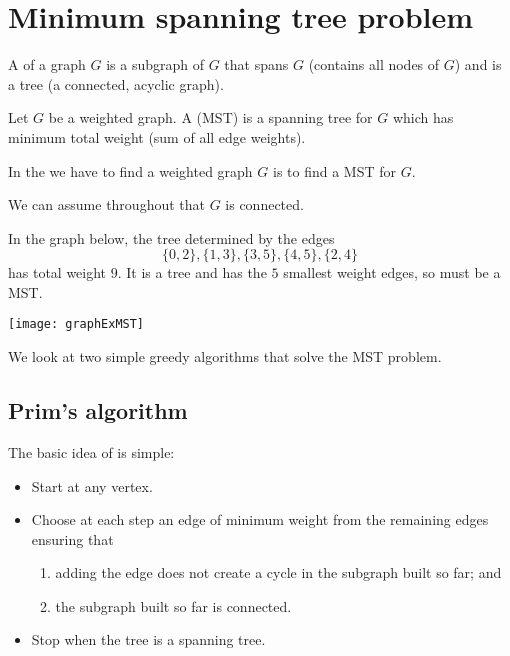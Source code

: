 \chapter{Minimum spanning tree problem} %
\label{sec:MST}
\begin{Definition}
A  of a graph $G$ is a subgraph of $G$ that spans $G$ (contains all nodes of $G$) and is a tree (a connected, acyclic graph).

Let $G$ be a weighted graph. 
A  (MST) is a spanning tree for $G$ which has minimum total weight 
(sum of all edge weights). 

In the  we have to find a weighted graph $G$ is to find a MST for $G$. 
\end{Definition}
We can assume throughout that $G$ is connected.


\begin{Boxample}
In the graph below, the tree determined by the edges
$$\{0, 2\}, \{1, 3\}, \{3, 5\}, \{4, 5\}, \{2, 4\}$$ 
has total weight $9$. 
It is a tree and has the $5$ smallest weight edges, so must be a MST.
\begin{center}
  \texttt{[image: graphExMST]}
\end{center}
\end{Boxample}

We look at two simple greedy algorithms that solve the MST problem.

\section{Prim's algorithm}
The basic idea of  is simple:
\begin{itemize}
\item Start at any vertex.
\item Choose at each step an edge of minimum weight from the remaining edges ensuring that
\begin{enumerate}
\item adding the edge does not create a cycle in the subgraph built so
far; and 
\item the subgraph built so far is connected.
\end{enumerate}
\item Stop when the tree is a spanning tree.
\end{itemize}

